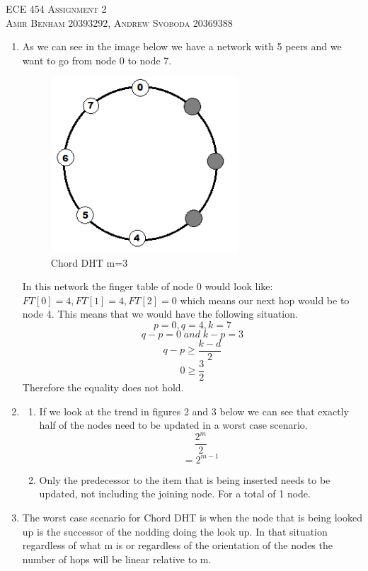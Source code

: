 \documentclass{article}
\begin{document}
\begin{center}
\textsc{\Large ECE 454 Assignment 2}\\[0.5cm]
\textsc{Amir Benham 20393292, Andrew Svoboda 20369388}\\[0.5cm]
\end{center}

\begin{enumerate}

	\item As we can see in the image below we have a network with 5 peers and we want to go from node 0 to node 7.
		
\begin{figure}[ht!]
\centering
\includegraphics[width=70mm]{q1.png}
\caption{Chord DHT m=3}
\label{overflow}
\end{figure}
	
	In this network the finger table of node 0 would look like: \(FT[0]=4, FT[1]=4, FT[2]=0\) which means our next hop would be to node 4. This means that we would have the following situation.
\[
p=0, q=4 , k=7
\]
\[
q-p=0 \; and\;  k-p=3
\]
\[
q-p \ge \frac{k-d}{2}
\]
\[
0\ge \frac{3}{2}
\]
Therefore the equality does not hold.

\item
 \begin{enumerate}
	\item If we look at the trend in figures 2 and 3 below we can see that exactly half of the nodes need to be updated in a worst case scenario.
\[
\frac{2^m} {2}
\]
\[
=2^{m-1}
\]



	\item Only the predecessor to the item that is being inserted needs to be updated, not including the joining node. For a total of 1 node.
\end{enumerate}

\item The worst case scenario for Chord DHT is when the node that is being looked up is the successor of the nodding doing the look up. In that situation regardless of what m is or regardless of the orientation of the nodes the number of hops will be linear relative to m. 


\end{enumerate}
\end{document}
